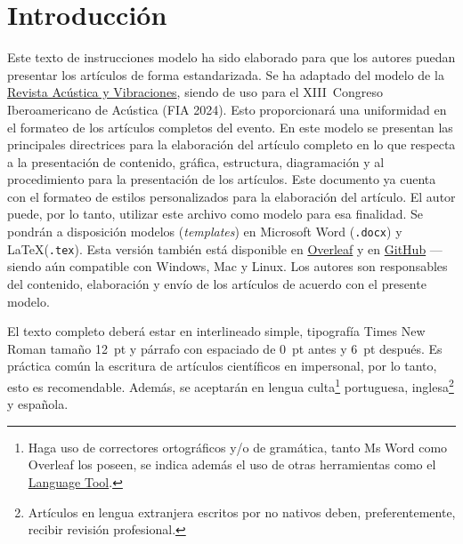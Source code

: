 
\section{Introducción}

Este texto de instrucciones modelo ha sido elaborado para que los autores puedan presentar los artículos de forma estandarizada.
%
Se ha adaptado del modelo de la \href{https://revista.acustica.org.br}{Revista Acústica y Vibraciones}, siendo de uso para el XIII~Congreso Iberoamericano de Acústica (FIA 2024).
Esto proporcionará una uniformidad en el formateo de los artículos completos del evento.
En este modelo se presentan las principales directrices para la elaboración del artículo completo en lo que respecta a la presentación de contenido, gráfica, estructura, diagramación y al procedimiento para la presentación de los artículos.
%
Este documento ya cuenta con el formateo de estilos personalizados para la elaboración del artículo. El autor puede, por lo tanto, utilizar este archivo como modelo para esa finalidad. Se pondrán a disposición modelos (\textit{templates}) en Microsoft Word (\texttt{.docx}) y \LaTeX\xspace (\texttt{.tex}). Esta versión también está disponible en \href{https://www.overleaf.com/read/tjbcfwbtfdtz\#869489}{Overleaf} y en \href{https://github.com/willdfonseca/latex}{GitHub} --- siendo aún compatible con Windows, Mac y Linux.
Los autores son responsables del contenido, elaboración y envío de los artículos de acuerdo con el presente modelo.

El texto completo deberá estar en interlineado simple, tipografía Times New Roman tamaño 12~pt y párrafo con espaciado de 0~pt antes y 6~pt después. Es práctica común la escritura de artículos científicos en impersonal, por lo tanto, esto es recomendable. Además, se aceptarán en lengua culta\footnote{Haga uso de correctores ortográficos y/o de gramática, tanto Ms Word como Overleaf los poseen, se indica además el uso de otras herramientas como el \href{https://languagetool.org/es}{Language Tool}.} portuguesa, inglesa\footnote{Artículos en lengua extranjera escritos por no nativos deben, preferentemente, recibir revisión profesional.} y española\footnotemark[2].


